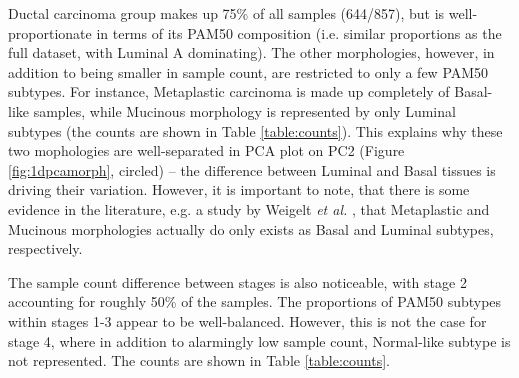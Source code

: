     Ductal carcinoma group makes up 75\% of all samples (644/857), but is well-proportionate in terms of its PAM50 composition (i.e. similar proportions as the full dataset, with Luminal A dominating). The other morphologies, however, in addition to being smaller in sample count, are restricted to only a few PAM50 subtypes. For instance, Metaplastic carcinoma is made up completely of Basal-like samples, while Mucinous morphology is represented by only Luminal subtypes (the counts are shown in Table \ref{table:counts}). This explains why these two mophologies are well-separated in PCA plot on PC2 (Figure \ref{fig:1dpcamorph}, circled) -- the difference between Luminal and Basal tissues is driving their variation. However, it is important to note, that there is some evidence in the literature, e.g. a study by Weigelt \textit{et al.} \cite{Weigelt2010a}, that Metaplastic and Mucinous morphologies actually do only exists as Basal and Luminal subtypes, respectively.  
    
    The sample count difference between stages is also noticeable, with stage 2 accounting for roughly 50\% of the samples. The proportions of PAM50 subtypes within stages 1-3 appear to be well-balanced. However, this is not the case for stage 4, where in addition to alarmingly low sample count, Normal-like subtype is not represented. The counts are shown in Table \ref{table:counts}.  
        
